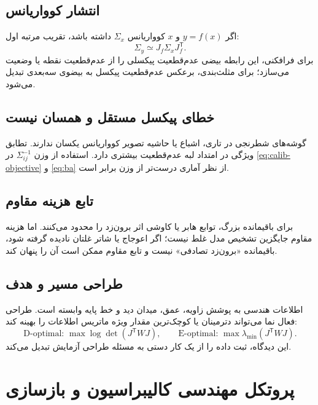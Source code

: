\documentclass[12pt,openany,oneside]{book}
\newcommand{\trans}{^{\mathsf T}}
\begin{document}
\subsection{انتشار کوواریانس}
اگر \(y=f(x)\) و \(x\) کوواریانس \(\Sigma_x\) داشته باشد، تقریب مرتبه اول:
\begin{equation}
\Sigma_y\simeq J_f\Sigma_xJ_f\trans.
\label{eq:cov-propagation}
\end{equation}
برای فرافکنی، این رابطه بیضی عدم‌قطعیت پیکسلی را از عدم‌قطعیت نقطه یا وضعیت می‌سازد؛ برای مثلث‌بندی، برعکس عدم‌قطعیت
پیکسل به بیضوی سه‌بعدی تبدیل می‌شود.

\subsection{خطای پیکسل مستقل و همسان نیست}
گوشه‌های شطرنجی در تاری، اشباع یا حاشیه تصویر کوواریانس یکسان ندارند. تطابق ویژگی در امتداد لبه عدم‌قطعیت بیشتری دارد.
استفاده از وزن \(\Sigma_{ij}^{-1}\) در \eqref{eq:calib-objective} و \eqref{eq:ba} از نظر آماری درست‌تر از وزن برابر است.

\subsection{تابع هزینه مقاوم}
برای باقیمانده بزرگ، توابع هابر یا کاوشی اثر برون‌زد را محدود می‌کنند. اما هزینه مقاوم جایگزین تشخیص مدل غلط نیست؛ اگر
اعوجاج یا شاتر غلتان نادیده گرفته شود، باقیمانده «برون‌زد تصادفی» نیست و تابع مقاوم ممکن است آن را پنهان کند.

\subsection{طراحی مسیر و هدف}
اطلاعات هندسی به پوشش زاویه، عمق، میدان دید و خط پایه وابسته است. طراحی فعال نما می‌تواند دترمینان یا کوچک‌ترین مقدار ویژه
ماتریس اطلاعات را بهینه کند:
\begin{equation}
\text{D-optimal: }\max\log\det(J\trans WJ),
\qquad
\text{E-optimal: }\max\lambda_{\min}(J\trans WJ).
\end{equation}
این دیدگاه، ثبت داده را از یک کار دستی به مسئله طراحی آزمایش تبدیل می‌کند.

\section{پروتکل مهندسی کالیبراسیون و بازسازی}
\end{document}
